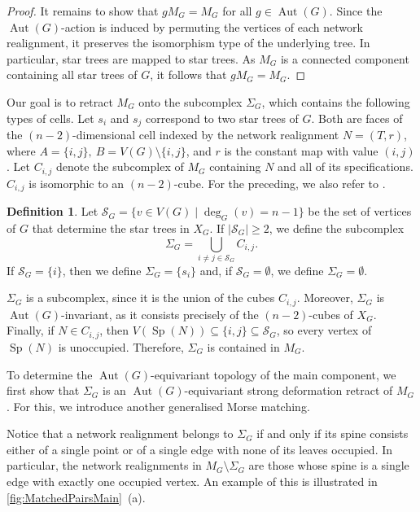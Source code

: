 \documentclass[reqno,dvipsnames]{amsart}
\theoremstyle{plain}
\numberwithin{equation}{section}
\theoremstyle{definition}
\newtheorem{definition}[theorem]{Definition}
\DeclareMathOperator{\degree}{deg}
\DeclareMathOperator{\Sp}{Sp}
\DeclareMathOperator{\Aut}{Aut}
\begin{document}
\begin{proof}
	It remains to show that $gM_G = M_G$ for all $g\in \Aut(G)$. Since the $\Aut(G)$-action is induced by permuting the vertices of each network realignment, it preserves the isomorphism type of the underlying tree. In particular, star trees are mapped to star trees. As $M_G$ is a connected component containing all star trees of $G$, it follows that $gM_G = M_G$.
\end{proof}

Our goal is to retract $M_G$ onto the subcomplex $\Sigma_G$, which contains the following types of cells. Let $s_i$ and $s_j$ correspond to two star trees of $G$. Both are faces of the $(n-2)$-dimensional cell indexed by the network realignment $N=(T,r)$, where $A=\{i,j\}, \> B=V(G)\setminus\{i,j\}$, and $r$ is the constant map with value $(i,j)$. Let $C_{i,j}$ denote the subcomplex of $M_G$ containing $N$ and all of its specifications. $C_{i,j}$ is isomorphic to an $(n-2)$-cube. For the preceding, we also refer to \cite[Proposition 4.9]{Kozlov25}.

\begin{definition}
	Let $\mathcal{S}_G = \{v\in V(G) \mid \degree_G(v) = n-1\}$ be the set of vertices of $G$ that determine the star trees in $X_G$. If $\vert\mathcal{S}_G\vert\geq 2$, we define the subcomplex 
	\begin{equation*}
		\Sigma_G = \bigcup_{i\neq j\in \mathcal{S}_G}C_{i,j}.
	\end{equation*}
	If $\mathcal{S}_G=\{i\}$, then we define $\Sigma_G=\{s_i\}$ and, if $\mathcal{S}_G=\emptyset$, we define $\Sigma_G=\emptyset$.
\end{definition}

$\Sigma_G$ is a subcomplex, since it is the union of the cubes $C_{i,j}$. Moreover, $\Sigma_G$ is $\Aut(G)$-invariant, as it consists precisely of the $(n-2)$-cubes of $X_G$. Finally, if $N\in C_{i,j}$, then $V(\Sp(N)) \subseteq \{i,j\} \subseteq \mathcal{S}_G$, so every vertex of $\Sp(N)$ is unoccupied. Therefore, $\Sigma_G$ is contained in $M_G$. 

To determine the $\Aut(G)$-equivariant topology of the main component, we first show that $\Sigma_G$ is an $\Aut(G)$-equivariant strong deformation retract of $M_G$. For this, we introduce another generalised Morse matching.

Notice that a network realignment belongs to $\Sigma_G$ if and only if its spine consists either of a single point or of a single edge with none of its leaves occupied. In particular, the network realignments in $M_G\setminus \Sigma_G$ are those whose spine is a single edge with exactly one occupied vertex. An example of this is illustrated in \autoref{fig:MatchedPairsMain}~(a).
\end{document}
